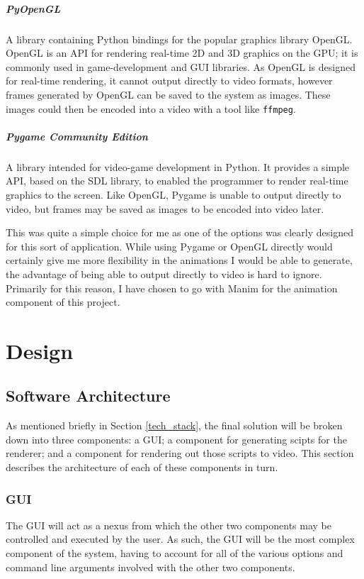 \documentclass{report}
\begin{document}
\paragraph{PyOpenGL}
A library containing Python bindings for the popular graphics library OpenGL.
OpenGL is an API for rendering real-time 2D and 3D graphics on the GPU; it is
commonly used in game-\allowbreak development and GUI libraries. As OpenGL is
designed for real-time rendering, it cannot output directly to video formats,
however frames generated by OpenGL can be saved to the system as images. These
images could then be encoded into a video with a tool like \texttt{ffmpeg}.

\paragraph{Pygame Community Edition}
A library intended for video-game development in Python. It provides a simple
API, based on the SDL library, to enabled the programmer to render real-time
graphics to the screen. Like OpenGL, Pygame is unable to output directly to
video, but frames may be saved as images to be encoded into video later.
\vspace{3.25ex}

This was quite a simple choice for me as one of the options was clearly
designed for this sort of application. While using Pygame or OpenGL directly
would certainly give me more flexibility in the animations I would be able to
generate, the advantage of being able to output directly to video is hard to
ignore. Primarily for this reason, I have chosen to go with Manim for the
animation component of this project.

\chapter{Design}

\section{Software Architecture} \label{software_arch}
As mentioned briefly in Section \ref{tech_stack}, the final solution will be
broken down into three components: a GUI; a component for generating scipts for
the renderer; and a component for rendering out those scripts to video. This
section describes the architecture of each of these components in turn.

\subsection{GUI}
The GUI will act as a nexus from which the other two components may be
controlled and executed by the user. As such, the GUI will be the most complex
component of the system, having to account for all of the various options and
command line arguments involved with the other two components.
\end{document}
